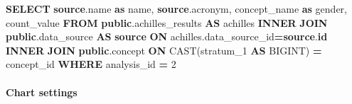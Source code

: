 \documentclass[
]{book}
\newenvironment{Shaded}{\begin{snugshade}}{\end{snugshade}}
\newcommand{\DecValTok}[1]{\textcolor[rgb]{0.00,0.00,0.81}{#1}}
\newcommand{\FunctionTok}[1]{\textcolor[rgb]{0.00,0.00,0.00}{#1}}
\newcommand{\KeywordTok}[1]{\textcolor[rgb]{0.13,0.29,0.53}{\textbf{#1}}}
\newcommand{\NormalTok}[1]{#1}
\newcommand{\OperatorTok}[1]{\textcolor[rgb]{0.81,0.36,0.00}{\textbf{#1}}}
\begin{document}
\begin{Shaded}
\begin{Highlighting}[]
\KeywordTok{SELECT} \KeywordTok{source}\NormalTok{.name }\KeywordTok{as}\NormalTok{ name,}
       \KeywordTok{source}\NormalTok{.acronym,}
\NormalTok{       concept\_name }\KeywordTok{as}\NormalTok{ gender,}
\NormalTok{       count\_value}
\KeywordTok{FROM} \KeywordTok{public}\NormalTok{.achilles\_results }\KeywordTok{AS}\NormalTok{ achilles}
\KeywordTok{INNER} \KeywordTok{JOIN} \KeywordTok{public}\NormalTok{.data\_source }\KeywordTok{AS} \KeywordTok{source} \KeywordTok{ON}\NormalTok{ achilles.data\_source\_id}\OperatorTok{=}\KeywordTok{source}\NormalTok{.}\KeywordTok{id}
\KeywordTok{INNER} \KeywordTok{JOIN} \KeywordTok{public}\NormalTok{.concept }\KeywordTok{ON} \FunctionTok{CAST}\NormalTok{(stratum\_1 }\KeywordTok{AS}\NormalTok{ BIGINT) }\OperatorTok{=}\NormalTok{ concept\_id}
\KeywordTok{WHERE}\NormalTok{ analysis\_id }\OperatorTok{=} \DecValTok{2}
\end{Highlighting}
\end{Shaded}

\hypertarget{chart-settings-31}{%
\paragraph*{Chart settings}\label{chart-settings-31}}
\end{document}
